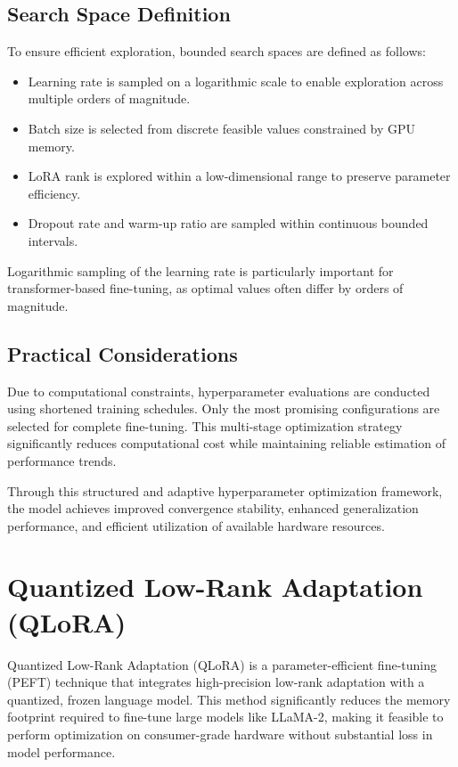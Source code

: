 \subsection{Search Space Definition}
To ensure efficient exploration, bounded search spaces are defined as follows:
\begin{itemize}
    \item Learning rate is sampled on a logarithmic scale to enable exploration across multiple orders of magnitude.
    \item Batch size is selected from discrete feasible values constrained by GPU memory.
    \item LoRA rank is explored within a low-dimensional range to preserve parameter efficiency.
    \item Dropout rate and warm-up ratio are sampled within continuous bounded intervals.
\end{itemize}

Logarithmic sampling of the learning rate is particularly important for transformer-based fine-tuning, as optimal values often differ by orders of magnitude.

\subsection{Practical Considerations}
Due to computational constraints, hyperparameter evaluations are conducted using shortened training schedules. Only the most promising configurations are selected for complete fine-tuning. This multi-stage optimization strategy significantly reduces computational cost while maintaining reliable estimation of performance trends.

Through this structured and adaptive hyperparameter optimization framework, the model achieves improved convergence stability, enhanced generalization performance, and efficient utilization of available hardware resources.



\section{Quantized Low-Rank Adaptation (QLoRA)}
Quantized Low-Rank Adaptation (QLoRA) is a parameter-efficient fine-tuning (PEFT) technique that integrates high-precision low-rank adaptation with a quantized, frozen language model. This method significantly reduces the memory footprint required to fine-tune large models like LLaMA-2, making it feasible to perform optimization on consumer-grade hardware without substantial loss in model performance.

